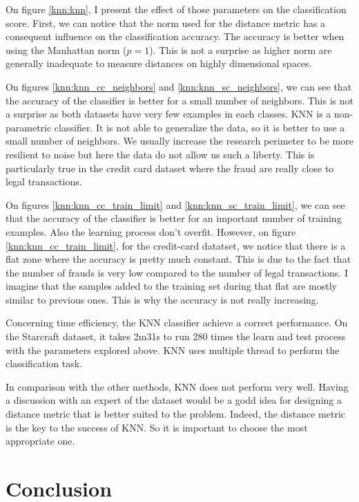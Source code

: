 \documentclass[twocolumn, a4paper, 10pt]{article}
\begin{document}
		On figure \ref{knn:knn}, I present the effect of those parameters on the classification score.
		First, we can notice that the norm used for the distance metric has a consequent influence on the classification accuracy. The accuracy is better when using the Manhattan norm ($p = 1$). This is not a surprise as higher norm are generally inadequate to measure distances on highly dimensional spaces.

		On figures \ref{knn:knn_cc_neighbors} and \ref{knn:knn_sc_neighbors}, we can see that the accuracy of the classifier is better for a small number of neighbors. This is not a surprise as both datasets have very few examples in each classes. KNN is a non-parametric classifier. It is not able to generalize the data, so it is better to use a small number of neighbors. We usually increase the research perimeter to be more resilient to noise but here the data do not allow us such a liberty. This is particularly true in the
		credit card dataset where the fraud are really close to legal transactions.

		On figures \ref{knn:knn_cc_train_limit} and \ref{knn:knn_sc_train_limit}, we can see that the accuracy of the classifier is better for an important number of training examples. Also the learning process don't overfit. However, on figure \ref{knn:knn_cc_train_limit}, for the credit-card datatset, we notice that there is a flat zone where the accuracy is pretty much constant. This is due to the fact that the number of frauds is very low compared to the number of legal transactions. I imagine that the samples added to the training set during that flat are mostly similar to previous ones. This is why the accuracy is not really increasing.

		Concerning time efficiency, the KNN classifier achieve a correct performance. On the Starcraft dataset, it takes 2m31s to run 280 times the learn and test process with the parameters explored above. KNN uses multiple thread to perform the classification task.

		In comparison with the other methods, KNN does not perform very well. Having a discussion with an expert of the dataset would be a godd idea for designing a distance metric that is better suited to the problem. Indeed, the distance metric is the key to the success of KNN. So it is important to choose the most appropriate one.
	\section{Conclusion}
\end{document}
